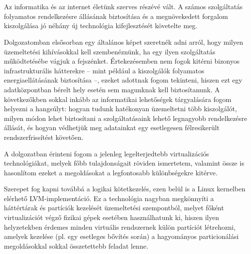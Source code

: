 \chapter{\bevezetes}

%

Az informatika és az internet életünk szerves részévé vált. A számos szolgáltatás folyamatos rendelkezésre állásának biztosítása és a megnövekedett forgalom kiszolgálása jó néhány új technológia kifejlesztését követelte meg.

Dolgozatomban elsősorban egy általános képet szeretnék adni arról, hogy milyen üzemeltetési kihívásokkal kell szembenéznünk, ha egy ilyen szolgáltatás működtetésébe vágjuk a fejszénket. Értekezésemben nem fogok kitérni bizonyos infrastrukturális hátterekre -- mint például a kiszolgálók folyamatos energiaellátásának biztosítása --, ezeket adottnak fogom tekinteni, hiszen ezt egy adatközpontban bérelt hely esetén sem magunknak kell biztosítanunk. A következőkben sokkal inkább az informatikai lehetőségek tárgyalására fogom helyezni a hangsúlyt: hogyan tudunk hatékonyan üzemeltetni több kiszolgálót, milyen módon lehet biztosítani a szolgáltatásaink lehető legnagyobb rendelkezésre állását, és hogyan védhetjük meg adatainkat egy esetlegesen félresikerült rendszerfrissítést követően.

A dolgozatban érinteni fogom a jelenleg legelterjedtebb virtualizációs technológiákat, melyek főbb tulajdonságait röviden ismertetem, valamint össze is hasonlítom ezeket a megoldásokat a legfontosabb különbségekre kitérve.

Szerepet fog kapni továbbá a logikai kötetkezelés, ezen belül is a Linux kernelben elérhető LVM-implementáció. Ez a technológia nagyban megkönnyíti a háttértárak és partíciók kezelését üzemeltetési szempontból, melyet főként virtualizációt végző fizikai gépek esetében használhatunk ki, hiszen ilyen helyzetekben érdemes minden virtuális rendszernek külön partíciót létrehozni, amelyek kezelése (pl. egy esetleges bővítés során) a hagyományos particionálási megoldásokkal sokkal összetettebb feladat lenne.


